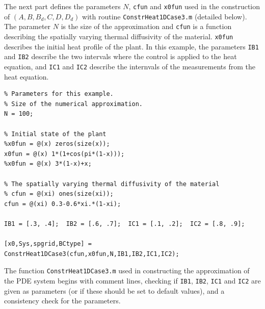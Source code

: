 \documentclass[11pt, a4paper]{amsart}
\theoremstyle{definition}
\numberwithin{equation}{section}
\begin{document}
The next part defines the parameters $N$, \texttt{cfun} and \texttt{x0fun} used in the construction of  $(A,B,B_d,C,D,D_d)$ with routine \texttt{ConstrHeat1DCase3.m} (detailed below). The parameter $N$ is the size of the approximation and \texttt{cfun} is a function describing the spatially varying thermal diffusivity of the material. \texttt{x0fun} describes the initial heat profile of the plant.
In this example, the parameters \texttt{IB1} and \texttt{IB2} describe the two intervals where the control is applied to the heat equation, and \texttt{IC1} and \texttt{IC2} describe the internvals of the measurements from the heat equation.

\begin{lstlisting}
% Parameters for this example.
% Size of the numerical approximation.
N = 100; 

% Initial state of the plant
%x0fun = @(x) zeros(size(x));
x0fun = @(x) 1*(1+cos(pi*(1-x)));
%x0fun = @(x) 3*(1-x)+x;

% The spatially varying thermal diffusivity of the material
% cfun = @(xi) ones(size(xi));
cfun = @(xi) 0.3-0.6*xi.*(1-xi);

IB1 = [.3, .4];  IB2 = [.6, .7];  IC1 = [.1, .2];  IC2 = [.8, .9];

[x0,Sys,spgrid,BCtype] = ConstrHeat1DCase3(cfun,x0fun,N,IB1,IB2,IC1,IC2);
 \end{lstlisting}

The function \texttt{ConstrHeat1DCase3.m} used in constructing the approximation of the PDE system begins with comment lines, checking if \texttt{IB1}, \texttt{IB2}, \texttt{IC1} and \texttt{IC2} are given as parameters (or if these should be set to default values), and a consistency check for the parameters.
\end{document}

